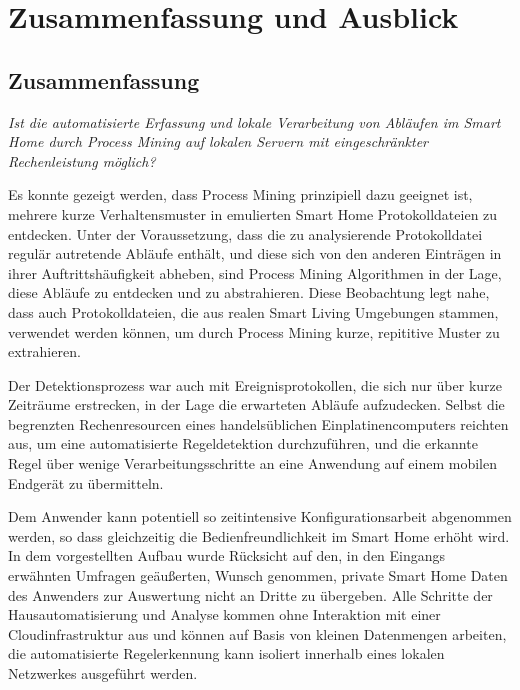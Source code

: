 \chapter{Zusammenfassung und Ausblick}
\section{Zusammenfassung}
\vspace{5mm}
\textsl{Ist die automatisierte Erfassung und lokale Verarbeitung von Abläufen im Smart Home durch Process Mining auf lokalen Servern mit eingeschränkter Rechenleistung möglich?}
\vspace{5mm}

Es konnte gezeigt werden, dass Process Mining prinzipiell dazu geeignet ist, mehrere kurze Verhaltensmuster in emulierten Smart Home Protokolldateien zu entdecken. Unter der Voraussetzung, dass die zu analysierende Protokolldatei regulär autretende Abläufe enthält, und diese sich von den anderen Einträgen in ihrer Auftrittshäufigkeit abheben, sind Process Mining Algorithmen in der Lage, diese Abläufe zu entdecken und zu abstrahieren. Diese Beobachtung legt nahe, dass auch Protokolldateien, die aus realen Smart Living Umgebungen stammen, verwendet werden können, um durch Process Mining kurze, repititive Muster zu extrahieren. 

Der Detektionsprozess war auch mit Ereignisprotokollen, die sich nur über kurze Zeiträume erstrecken, in der Lage die erwarteten Abläufe aufzudecken. Selbst die begrenzten Rechenresourcen eines handelsüblichen Einplatinencomputers reichten aus, um eine automatisierte Regeldetektion durchzuführen, und die erkannte Regel über wenige Verarbeitungsschritte an eine Anwendung auf einem mobilen Endgerät zu übermitteln.

Dem Anwender kann potentiell so zeitintensive Konfigurationsarbeit abgenommen werden, so dass gleichzeitig die Bedienfreundlichkeit im Smart Home erhöht wird. In dem vorgestellten Aufbau wurde Rücksicht auf den, in den Eingangs erwähnten Umfragen geäußerten, Wunsch genommen, private Smart Home Daten des Anwenders zur Auswertung nicht an Dritte zu übergeben. Alle Schritte der Hausautomatisierung und Analyse kommen ohne Interaktion mit einer Cloudinfrastruktur aus und können auf Basis von kleinen Datenmengen arbeiten, die automatisierte Regelerkennung kann isoliert innerhalb eines lokalen Netzwerkes ausgeführt werden.


